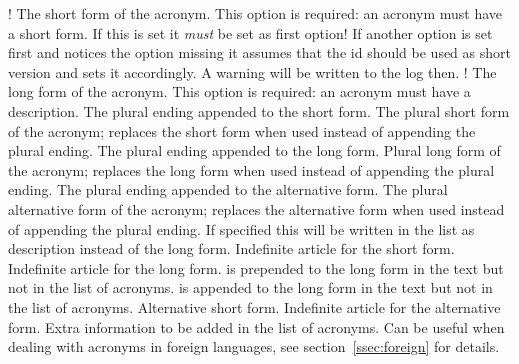 \documentclass[load-preamble+]{cnltx-doc}
\begin{document}
\begin{options}
  \Default!
    The short form of the acronym.  This option is required: an acronym must
    have a short form.  If this is set it \emph{must} be set as first option!
    If another option is set first and notices the  option
    missing it assumes that the \acs{id} should be used as short version and
    sets it accordingly.  A warning will be written to the log then.
  \Default!
    The long form of the acronym.  This option is required: an acronym must
    have a description.
    The plural ending appended to the short form.
    The plural short form of the acronym; replaces the short
    form when used instead of appending the plural ending.
    The plural ending appended to the long form.
    Plural long form of the acronym; replaces the long form when used
    instead of appending the plural ending.
    The plural ending appended to the alternative form.
    The plural alternative form of the acronym; replaces the
    alternative form when used instead of appending the plural ending.
    If specified this will be written in the list as description instead of
    the long form.
    Indefinite article for the short form.
    Indefinite article for the long form.
     is prepended to the long form in the text but not in the list
    of acronyms.
     is appended to the long form in the text but not in the list
    of acronyms.
    Alternative short form.
    Indefinite article for the alternative form.
    Extra information to be added in the list of acronyms.
    Can be useful when dealing with acronyms in foreign languages, see
    section~\vref{ssec:foreign} for details.

\end{options}
\end{document}
